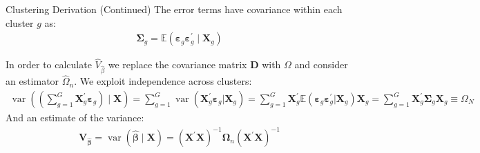 \begin{frame}{Clustering Derivation (Continued)}
The error terms have covariance within each cluster $g$ as:
\begin{align*}
 \boldsymbol{\Sigma}_ { g } = \mathbb { E } \left( \boldsymbol{\varepsilon} _ { g }  \boldsymbol{ \varepsilon } _ { g } ^ { \prime } \mid \boldsymbol { X } _ { g } \right)
\end{align*}

In order to calculate $\widehat{V}_{\widehat{\beta}}$ we replace the covariance matrix $\mathbf{D}$ with $\Omega$ and consider an estimator $\widehat{\Omega}_n$. We exploit \alert{independence across clusters}:
\begin{align*}
\operatorname { var } \left( \left( \sum _ { g = 1 } ^ { G } \boldsymbol { X } _ { g } ^ { \prime } \boldsymbol{\varepsilon}_{ g } \right) \mid \boldsymbol { X } \right) = \sum _ { g = 1 } ^ { G } \operatorname { var } \left( \boldsymbol { X } _ { g } ^ { \prime } \boldsymbol{\varepsilon} _ { g } | \boldsymbol { X } _ { g } \right)
= \sum _ { g = 1 } ^ { G } \boldsymbol { X } _ { g } ^ { \prime } \mathbb { E } \left( \boldsymbol{\varepsilon} _ { g } \boldsymbol{\varepsilon}_ { g } ^ { \prime } | \boldsymbol { X } _ { g } \right) \boldsymbol { X } _ { g }
= \sum _ { g = 1 } ^ { G } \boldsymbol { X } _ { g } ^ { \prime } \boldsymbol { \Sigma } _ { g } \mathbf { X } _ { g } 
 \equiv \Omega_N
\end{align*}
And an estimate of the variance:
\begin{align*}
\boldsymbol { V } _ { \widehat { \boldsymbol { \beta } } } = \operatorname { var } ( \widehat { \boldsymbol { \beta } } \mid  \boldsymbol { X } )
= \left( \mathbf { X } ^ { \prime } \mathbf { X } \right) ^ { - 1 } \boldsymbol { \Omega } _ { n } \left( \mathbf { X } ^ { \prime } \mathbf { X } \right) ^ { - 1 }
\end{align*}
\end{frame}




